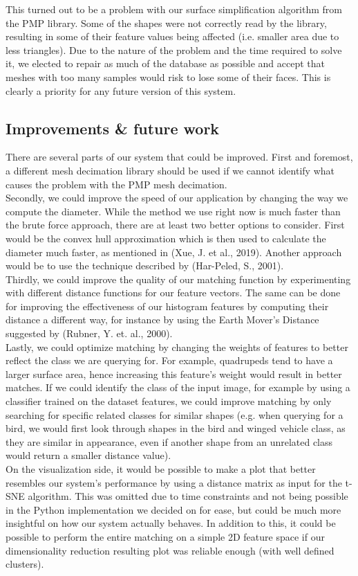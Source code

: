 \documentclass{bigdata}
\begin{document}
This turned out to be a problem with our surface simplification algorithm from the PMP library. Some of the shapes were not correctly read by the library, resulting in some of their feature values being affected (i.e. smaller area due to less triangles). Due to the nature of the problem and the time required to solve it, we elected to repair as much of the database as possible and accept that meshes with too many samples would risk to lose some of their faces. This is clearly a priority for any future version of this system.

\pagebreak

\subsection{Improvements \& future work}

There are several parts of our system that could be improved. First and foremost, a different mesh decimation library should be used if we cannot identify what causes the problem with the PMP mesh decimation. \\
Secondly, we could improve the speed of our application by changing the way we compute the diameter. While the method we use right now is much faster than the brute force approach, there are at least two better options to consider. First would be the convex hull approximation which is then used to calculate the diameter much faster, as mentioned in (Xue, J. et al., 2019). Another approach would be to use the technique described by (Har-Peled, S., 2001). \\
Thirdly, we could improve the quality of our matching function by experimenting with different distance functions for our feature vectors. The same can be done for improving the effectiveness of our histogram features by computing their distance a different way, for instance by using the Earth Mover's Distance suggested by (Rubner, Y. et. al., 2000). \\
Lastly, we could optimize matching by changing the weights of features to better reflect the class we are querying for. For example, quadrupeds tend to have a larger surface area, hence increasing this feature's weight would result in better matches. If we could identify the class of the input image, for example by using a classifier trained on the dataset features, we could improve matching by only searching for specific related classes for similar shapes (e.g. when querying for a bird, we would first look through shapes in the bird and winged vehicle class, as they are similar in appearance, even if another shape from an unrelated class would return a smaller distance value). \\
On the visualization side, it would be possible to make a plot that better resembles our system's performance by using a distance matrix as input for the t-SNE algorithm. This was omitted due to time constraints and not being possible in the Python implementation we decided on for ease, but could be much more insightful on how our system actually behaves. In addition to this, it could be possible to perform the entire matching on a simple 2D feature space if our dimensionality reduction resulting plot was reliable enough (with well defined clusters).
\end{document}
